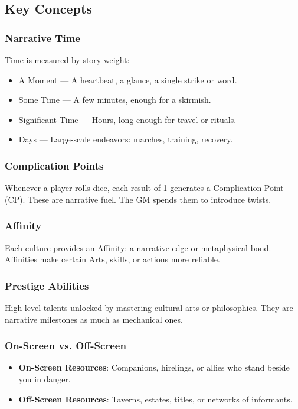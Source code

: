 \documentclass[11pt]{article}
\begin{document}
\subsection{Key Concepts}

\subsubsection{Narrative Time}
Time is measured by story weight:
\begin{itemize}
    \item A Moment — A heartbeat, a glance, a single strike or word.
    \item Some Time — A few minutes, enough for a skirmish.
    \item Significant Time — Hours, long enough for travel or rituals.
    \item Days — Large-scale endeavors: marches, training, recovery.
\end{itemize}

\subsubsection{Complication Points}
Whenever a player rolls dice, each result of 1 generates a Complication Point (CP). These are narrative fuel. The GM spends them to introduce twists.

\subsubsection{Affinity}
Each culture provides an Affinity: a narrative edge or metaphysical bond. Affinities make certain Arts, skills, or actions more reliable.

\subsubsection{Prestige Abilities}
High-level talents unlocked by mastering cultural arts or philosophies. They are narrative milestones as much as mechanical ones.

\subsubsection{On-Screen vs. Off-Screen}
\begin{itemize}
    \item \textbf{On-Screen Resources}: Companions, hirelings, or allies who stand beside you in danger.
    \item \textbf{Off-Screen Resources}: Taverns, estates, titles, or networks of informants.
\end{itemize}
\end{document}
